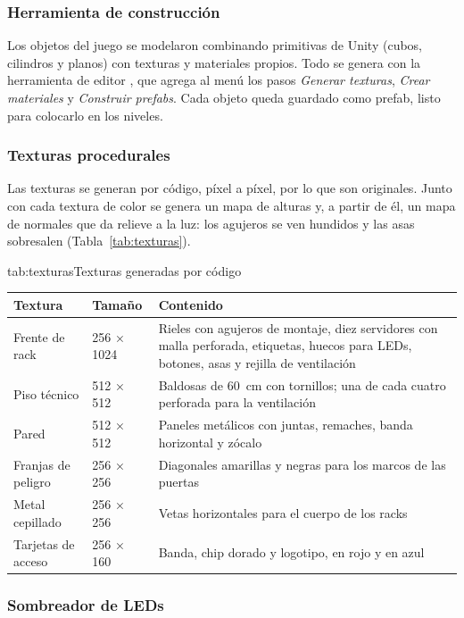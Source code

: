 \subsubsection{Herramienta de construcción}

Los objetos del juego se modelaron combinando primitivas de Unity (cubos, cilindros y planos) con
texturas y materiales propios. Todo se genera con la herramienta de editor
, que agrega al menú  \textrightarrow{}  los pasos
\textit{Generar texturas}, \textit{Crear materiales} y \textit{Construir prefabs}. Cada objeto queda
guardado como prefab, listo para colocarlo en los niveles.

\subsubsection{Texturas procedurales}

Las texturas se generan por código, píxel a píxel, por lo que son originales. Junto con cada
textura de color se genera un mapa de alturas y, a partir de él, un mapa de normales que da relieve
a la luz: los agujeros se ven hundidos y las asas sobresalen (Tabla~\ref{tab:texturas}).

\begin{TablaAPA}{tab:texturas}{Texturas generadas por código}
\begin{tabularx}{\linewidth}{P{3.6cm}P{2.3cm}L}
\toprule
Textura & Tamaño & Contenido \\
\midrule
Frente de rack & 256 × 1024 & Rieles con agujeros de montaje, diez servidores con malla perforada, etiquetas, huecos para LEDs, botones, asas y rejilla de ventilación \\
Piso técnico & 512 × 512 & Baldosas de 60~cm con tornillos; una de cada cuatro perforada para la ventilación \\
Pared & 512 × 512 & Paneles metálicos con juntas, remaches, banda horizontal y zócalo \\
Franjas de peligro & 256 × 256 & Diagonales amarillas y negras para los marcos de las puertas \\
Metal cepillado & 256 × 256 & Vetas horizontales para el cuerpo de los racks \\
Tarjetas de acceso & 256 × 160 & Banda, chip dorado y logotipo, en rojo y en azul \\
\bottomrule
\end{tabularx}
\end{TablaAPA}

\subsubsection{Sombreador de LEDs}

